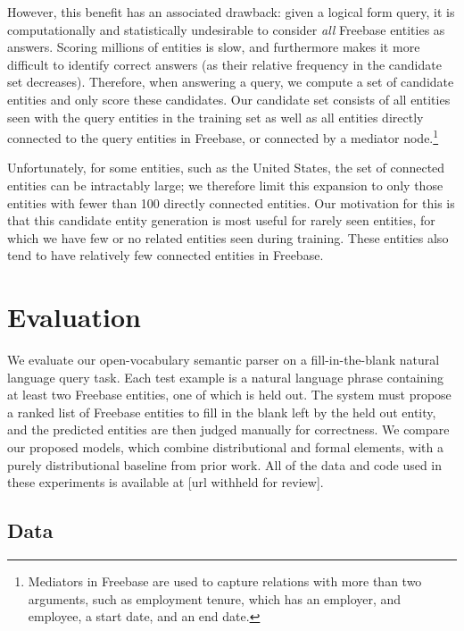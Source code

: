 \documentclass[11pt]{article}
\begin{document}
However, this benefit has an associated drawback: given a logical form query,
it is computationally and statistically undesirable to consider \emph{all}
Freebase entities as answers. Scoring millions of entities is slow, and
furthermore makes it more difficult to identify correct answers (as their
relative frequency in the candidate set decreases).  Therefore, when answering
a query, we compute a set of candidate entities and only score these
candidates. Our candidate set consists of all entities seen with the query
entities in the training set as well as all entities directly connected to the
query entities in Freebase, or connected by a mediator node.\footnote{Mediators
in Freebase are used to capture relations with more than two arguments, such as
employment tenure, which has an employer, and employee, a start date, and an
end date.}

Unfortunately, for some entities, such as the United States, the set of
connected entities can be intractably large; we therefore limit this expansion
to only those entities with fewer than 100 directly connected entities.  Our
motivation for this is that this candidate entity generation is most useful for
rarely seen entities, for which we have few or no related entities seen during
training.  These entities also tend to have relatively few connected entities
in Freebase.

\section{Evaluation}
\label{sec:evaluation}

We evaluate our open-vocabulary semantic parser on a fill-in-the-blank natural
language query task.  Each test example is a natural language phrase containing
at least two Freebase entities, one of which is held out.  The system must
propose a ranked list of Freebase entities to fill in the blank left by the
held out entity, and the predicted entities are then judged manually for
correctness.  We compare our proposed models, which combine distributional and
formal elements, with a purely distributional baseline from prior work.  All of
the data and code used in these experiments is available at [url withheld for
review].

\subsection{Data}
\end{document}
